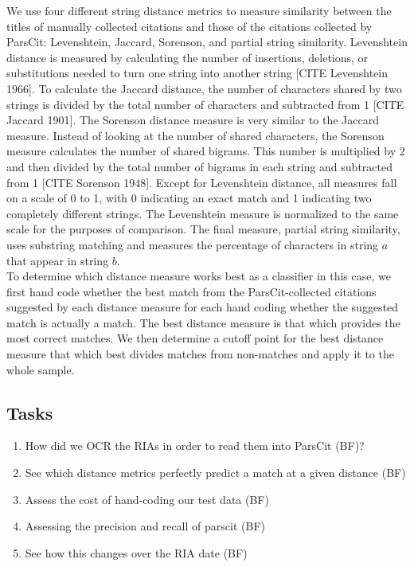 \documentclass[12pt]{article}
\begin{document}
We use four different string distance metrics to measure similarity between the titles of manually collected citations and those of the citations collected by ParsCit: Levenshtein, Jaccard, Sorenson, and partial string similarity. Levenshtein distance is measured by calculating the number of insertions, deletions, or substitutions needed to turn one string into another string [CITE Levenshtein 1966]. To calculate the Jaccard distance, the number of characters shared by two strings is divided by the total number of characters and subtracted from 1 [CITE Jaccard 1901]. The Sorenson distance measure is very similar to the Jaccard measure. Instead of looking at the number of shared characters, the Sorenson measure calculates the number of shared bigrams. This number is multiplied by 2 and then divided by the total number of bigrams in each string and subtracted from 1 [CITE Sorenson 1948]. Except for Levenshtein distance, all measures fall on a scale of 0 to 1, with 0 indicating an exact match and 1 indicating two completely different strings. The Levenshtein measure is normalized to the same scale for the purposes of comparison. The final measure, partial string similarity, uses substring matching and measures the percentage of characters in string $a$ that appear in string $b$.\\

To determine which distance measure works best as a classifier in this case, we first hand code whether the best match from the ParsCit-collected citations suggested by each distance measure for each hand coding whether the suggested match is actually a match. The best distance measure is that which provides the most correct matches. We then determine a cutoff point for the best distance measure that which best divides matches from non-matches and apply it to the whole sample.\\

\subsection{Tasks}

\begin{enumerate}
\item How did we OCR the RIAs in order to read them into ParsCit (BF)?
\item See which distance metrics perfectly predict a match at a given distance (BF)
\item Assess the cost of hand-coding our test data (BF)
\item Assessing the precision and recall of parscit (BF)
\item See how this changes over the RIA date (BF)
\end{enumerate}
\end{document}
